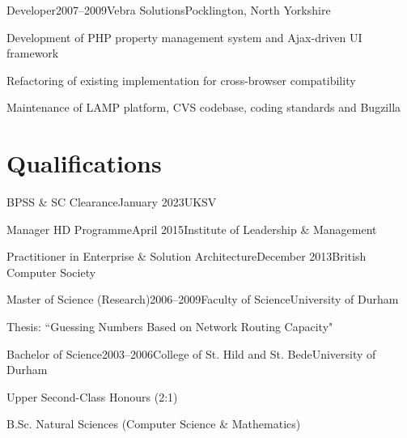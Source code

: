 \documentclass{cv}
\begin{document}

\begin{experience}{Developer}{2007--2009}{Vebra Solutions}{Pocklington, North Yorkshire}
\item Development of PHP property management system and Ajax-driven UI framework
\item Refactoring of existing implementation for cross-browser compatibility
\item Maintenance of LAMP platform, CVS codebase, coding standards and Bugzilla
\end{experience}


\section{Qualifications}

\begin{experienceplain}{BPSS \& SC Clearance}{January 2023}{UKSV}{}
\end{experienceplain}

\begin{experienceplain}{Manager HD Programme}{April 2015}{Institute of Leadership \& Management}{}
\end{experienceplain}

\begin{experienceplain}{Practitioner in Enterprise \& Solution Architecture}{December 2013}{British Computer Society}{}
\end{experienceplain}

\begin{experience}{Master of Science (Research)}{2006--2009}{Faculty of Science}{University of Durham}
\item Thesis: ``Guessing Numbers Based on Network Routing Capacity"
\end{experience}

\begin{experience}{Bachelor of Science}{2003--2006}{College of St. Hild and St. Bede}{University of Durham}
\item Upper Second-Class Honours (2:1)
\item B.Sc. Natural Sciences (Computer Science \& Mathematics)
\end{experience}
\end{document}
